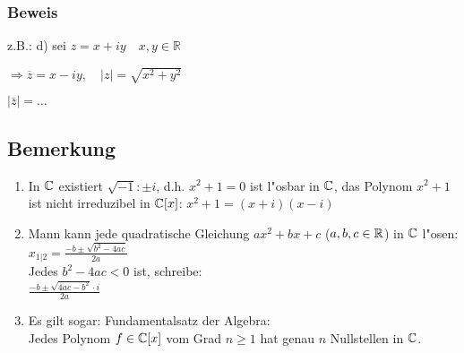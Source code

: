 \subsubsection*{Beweis}

z.B.: d) sei $z = x + iy \quad x,y \in \mathbb{R}$

$\Rightarrow \overline{z} = x - iy, \quad |z| = \sqrt{x^2+y^2}$

$|\overline{z}|=\dots$

\subsection{Bemerkung}
\begin{enumerate}
	\item
	In $\mathbb{C}$ existiert $\sqrt{-1}: \pm i$, d.h. $x^2+1=0$ ist l"osbar in $\mathbb{C}$, das Polynom $x^2+1$ ist nicht irreduzibel in $\mathbb{C}[x]$: $ x^2+1 = (x+i)(x-i)$
	\item
	Mann kann jede quadratische Gleichung $ax^2+bx+c$ ($a,b,c\in \mathbb{R}$) in $\mathbb{C}$ l"osen:\\
	$x_{1|2} = \frac{-b \pm \sqrt{b^2-4ac}}{2a}$\\
	Jedes $b^2-4ac < 0$ ist, schreibe:\\
	$\frac{-b \pm \sqrt{4ac-b^2}\cdot i}{2a}$
	\item
	Es gilt sogar: Fundamentalsatz der Algebra:\\
	Jedes Polynom $f\in \mathbb{C}[x]$ vom Grad $n\geq 1$ hat genau $n$ Nullstellen in $\mathbb{C}$. 
\end{enumerate}